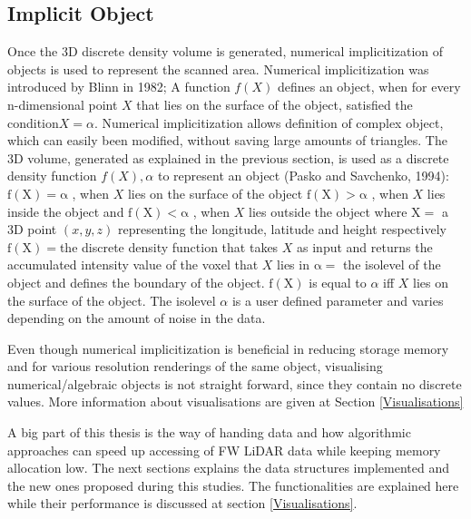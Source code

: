 \documentclass{subfiles}
\begin{document}
\subsection{Implicit Object}
Once the 3D discrete density volume is generated, numerical implicitization of objects is used to represent the scanned area. Numerical implicitization was introduced by Blinn in 1982; A function $ \mathit{f(X)} $ defines an object, when for every n-dimensional point $ \mathit{X} $  that lies on the surface of the object, satisfied the condition$ \mathit{X=\alpha }  $. Numerical implicitization allows definition of complex object, which can easily been modified, without saving large amounts of triangles. \newline
The 3D volume, generated as explained in the previous section, is used as a discrete density function $\mathit{f(X), \alpha }$ to represent an object (Pasko and Savchenko, 1994): \newline
$	\mathrm{f(X) = \alpha }$ , when $X$ lies on the surface of the object\newline
$	\mathrm{f(X) > \alpha }$ , when $X$ lies inside the object and\newline
$	\mathrm{f(X) < \alpha }$ , when $X$ lies outside the object	 \newline
where	\newline 
$	\mathrm{X 	=}$  a 3D point $\mathit{(x, y, z) }$ representing the longitude, latitude and height respectively  \newline
$	\mathrm{f(X) 	= }$the discrete density function that takes  $\mathit{X}$ as input and returns the accumulated intensity value of the voxel that  $\mathit{X}$ lies in \newline
$	\mathrm{	\alpha 	= }$ the isolevel of the object and defines the boundary of the object. \newline
$	\mathrm{	f(X)}$ is equal to $\mathit{\alpha }$ iff  $\mathit{X}$ lies on the surface of the object. The isolevel $\mathit{\alpha }$ is a user defined parameter and varies depending on the amount of noise in the data.  \newline

Even though numerical implicitization is beneficial in reducing storage memory and for various resolution renderings of the same object, visualising numerical/algebraic objects is not straight forward, since they contain no discrete values. More information about visualisations are given at Section \ref{Visualisations}

A big part of this thesis is the way of handing data and how algorithmic approaches can speed up accessing of FW LiDAR data while keeping memory allocation low. The next sections explains the data structures implemented and the new ones proposed during this studies. The functionalities are explained here while their performance is discussed at section \ref{Visualisations}. 
\end{document}
